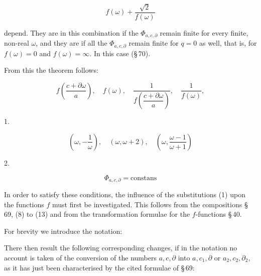
\[
f(\omega) + \frac{\sqrt{2}}{f(\omega)}
\]

depend. They are  in this combination
if the $\Phi_{a,c,\partial}$ remain finite for every finite, non-real $\omega$,
and they are  if all the $\Phi_{a,c,\partial}$ remain finite for $q = 0$ as well, that is,
for $f(\omega) = 0$ and $f(\omega) = \infty$. In this case
(\S\,70).

From this the theorem follows:


\[
f\left(\frac{c+\partial\omega}{a}\right), \quad f(\omega), \quad \frac{1}{f\left(\dfrac{c+\partial\omega}{a}\right)}, \quad \frac{1}{f(\omega)},
\]


1. 

\[
\left(\omega, -\frac{1}{\omega}\right), \quad (\omega, \omega+2), \quad \left(\omega, \frac{\omega-1}{\omega+1}\right)
\]


2. 

\[
\Phi_{a,c,\partial} = \text{constans}
\]


In order to satisfy these conditions, the influence
of the substitutions (1) upon the functions $f$ must first be investigated.
This follows from the compositions \S\,69, (8) to (13)
and from the transformation formulae for the $f$-functions \S\,40.

For brevity we introduce the notation:


There then result the following corresponding changes, if in the
notation no account is taken of the conversion of the
numbers $a, c, \partial$ into $a, c_1, \partial$ or $a_2, c_2, \partial_2$, as it has just been
characterised by the cited formulae of \S\,69:

